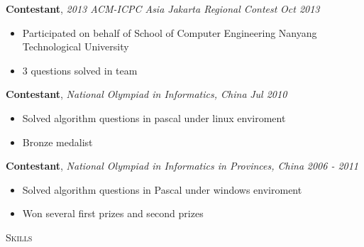 \documentclass[9pt]{article}
\newenvironment{changemargin}[2]{%
  \begin{list}{}{%
      \setlength{\topsep}{0pt}%
      \setlength{\leftmargin}{#1}%
      \setlength{\rightmargin}{#2}%
      \setlength{\listparindent}{\parindent}%
      \setlength{\itemindent}{\parindent}%
      \setlength{\parsep}{\parskip}%
    }%
  \item[]}{\end{list}
}
\newcommand{\lineover}{
  \begin{changemargin}{-0.05in}{-0.05in}
    \vspace*{-8pt}
    \hrulefill \\
    \vspace*{-2pt}
  \end{changemargin}
}
\newcommand{\header}[1]{
  \begin{changemargin}{-0.5in}{-0.5in}
    \scshape{#1}\\
    \lineover
  \end{changemargin}
}
\newenvironment{body}
{
\vspace*{-16pt}
\begin{changemargin}{-0.25in}{-0.5in}
}	
{
\end{changemargin}
}
\begin{document}
\begin{body}
  \vspace{14pt}
  \textbf{Contestant}, \emph{2013 ACM-ICPC Asia Jakarta Regional Contest} \hfill \emph{Oct 2013}\\
  \vspace*{-4pt}
  \begin{itemize} \itemsep -0pt  %
  \item Participated on behalf of School of Computer Engineering Nanyang Technological University
  \item 3 questions solved in team
  \end{itemize}
  
  \textbf {Contestant}, \emph{National Olympiad in Informatics, China} \hfill \emph{Jul 2010}\\
  \vspace*{-4pt}
  \begin{itemize} \itemsep -0pt
  \item Solved algorithm questions in pascal under linux enviroment
  \item Bronze medalist
  \end{itemize}

  \textbf {Contestant}, \emph{National Olympiad in Informatics in Provinces, China} \hfill \emph{2006 - 2011}\\
  \vspace*{-4pt}
  \begin{itemize} \itemsep -0pt
  \item Solved algorithm questions in Pascal under windows enviroment
  \item Won several first prizes and second prizes
  \end{itemize}
\end{body}

\smallskip

%
%
%
%
\header{Skills}
\end{document}
